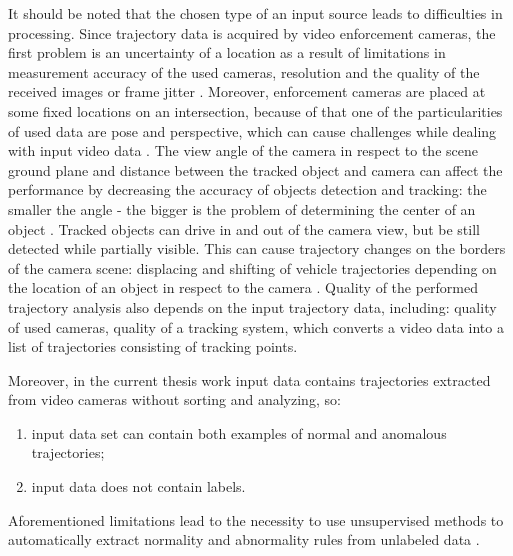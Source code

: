 It should be noted that the chosen type of an input source leads to difficulties in processing. Since trajectory data is acquired by video enforcement cameras, the first problem is an uncertainty of a location as a result of limitations in measurement accuracy of the used cameras, resolution and the quality of the received images or frame jitter \cite{article:4_detect_eatp}. Moreover, enforcement cameras are placed at some fixed locations on an intersection, because of that one of the particularities of used data are pose and perspective, which can cause challenges while dealing with input video data \cite{article:6_survey_anom_det_rtuvs}. The view angle of the camera in respect to the scene ground plane and distance between the tracked object and camera can affect the performance by decreasing the accuracy of objects detection and tracking: the smaller the angle - the bigger is the problem of determining the center of an object \cite{article:9_trb_vc_aev_sc}\cite{article:4_detect_eatp}. Tracked objects can drive in and out of the camera view, but be still detected while partially visible. This can cause trajectory changes on the borders of the camera scene: displacing and shifting of vehicle trajectories depending on the location of an object in respect to the camera \cite{article:4_detect_eatp}. Quality of the performed trajectory analysis also depends on the input trajectory data, including: quality of used cameras, quality of a tracking system, which converts a video data into a list of trajectories consisting of tracking points.

Moreover, in the current thesis work input data contains trajectories extracted from video cameras without sorting and analyzing, so:
\begin{enumerate}
	\item input data set can contain both examples of normal and anomalous trajectories;
	\item input data does not contain labels.
\end{enumerate}

Aforementioned limitations lead to the necessity to use unsupervised methods to automatically extract normality and abnormality rules from unlabeled data \cite{article:27_vna_cad_td}.